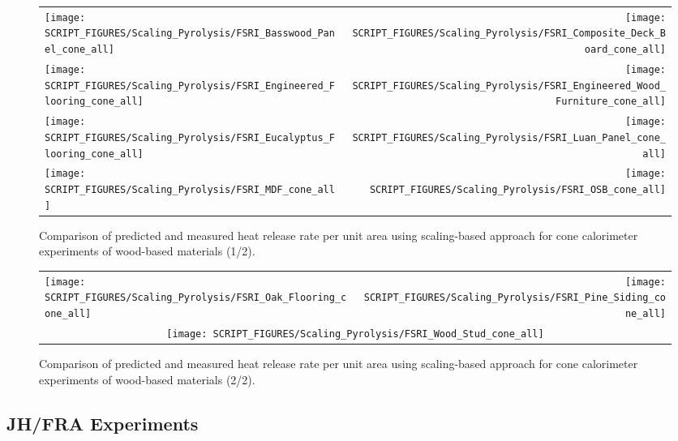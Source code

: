 \begin{figure}[p]
\begin{tabular*}{\textwidth}{l@{\extracolsep{\fill}}r}
\texttt{[image: SCRIPT\_FIGURES/Scaling\_Pyrolysis/FSRI\_Basswood\_Panel\_cone\_all]} &
\texttt{[image: SCRIPT\_FIGURES/Scaling\_Pyrolysis/FSRI\_Composite\_Deck\_Board\_cone\_all]} \\
\texttt{[image: SCRIPT\_FIGURES/Scaling\_Pyrolysis/FSRI\_Engineered\_Flooring\_cone\_all]} &
\texttt{[image: SCRIPT\_FIGURES/Scaling\_Pyrolysis/FSRI\_Engineered\_Wood\_Furniture\_cone\_all]} \\
\texttt{[image: SCRIPT\_FIGURES/Scaling\_Pyrolysis/FSRI\_Eucalyptus\_Flooring\_cone\_all]} &
\texttt{[image: SCRIPT\_FIGURES/Scaling\_Pyrolysis/FSRI\_Luan\_Panel\_cone\_all]} \\
\texttt{[image: SCRIPT\_FIGURES/Scaling\_Pyrolysis/FSRI\_MDF\_cone\_all]} &
\texttt{[image: SCRIPT\_FIGURES/Scaling\_Pyrolysis/FSRI\_OSB\_cone\_all]} \\
\end{tabular*}
\caption[HRRPUA of FSRI materials using scaling model, wood-based materials]
{Comparison of predicted and measured heat release rate per unit area using scaling-based approach for cone calorimeter experiments of wood-based materials (1/2).}
\label{FSRI_Materials_woods1}
\end{figure}

\begin{figure}[p]
\begin{tabular*}{\textwidth}{l@{\extracolsep{\fill}}r}
\texttt{[image: SCRIPT\_FIGURES/Scaling\_Pyrolysis/FSRI\_Oak\_Flooring\_cone\_all]} &
\texttt{[image: SCRIPT\_FIGURES/Scaling\_Pyrolysis/FSRI\_Pine\_Siding\_cone\_all]} \\
 \multicolumn{2}{c}{\texttt{[image: SCRIPT\_FIGURES/Scaling\_Pyrolysis/FSRI\_Wood\_Stud\_cone\_all]}}
\end{tabular*}
\caption[HRRPUA of FSRI materials using scaling model, wood-based materials]
{Comparison of predicted and measured heat release rate per unit area using scaling-based approach for cone calorimeter experiments of wood-based materials (2/2).}
\label{FSRI_Materials_woods2}
\end{figure}

\clearpage

\subsection{JH/FRA Experiments}\label{sec_JH_FRA_Materials}

